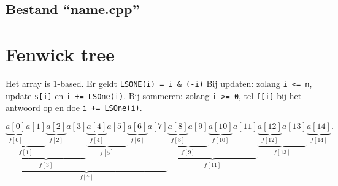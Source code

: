 \documentclass[10pt,a4paper,titlepage]{article}
\begin{document}
\subsection{Bestand ``name.cpp''}
\begin{multicols}{2}

\end{multicols}
\fi

\section{Fenwick tree}

Het array is 1-based. Er geldt \verb.LSONE(i) = i & (-i). Bij updaten: zolang \verb.i <= n., update \verb.s[i]. en \verb.i += LSOne(i).. Bij sommeren: zolang \verb.i >= 0., tel \verb.f[i]. bij het antwoord op en doe \verb.i += LSOne(i)..

\iffalse
\[
\underbrace{
\underbrace{\underbrace{\underbrace{a[0]}_{f[0]} a[1]}_{f[1]} \underbrace{a[2]}_{f[2]} a[3]}_{f[3]}
\underbrace{\underbrace{a[4]}_{f[4]} a[5]}_{f[5]} \underbrace{a[6]}_{f[6]} a[7]}_{f[7]}
\underbrace{\underbrace{\underbrace{a[8]}_{f[8]} a[9]}_{f[9]} \underbrace{a[10]}_{f[10]} a[11]}_{f[11]}
\underbrace{\underbrace{a[12]}_{f[12]} a[13]}_{f[13]} \underbrace{a[14]}_{f[14]}.
\]
\end{document}
